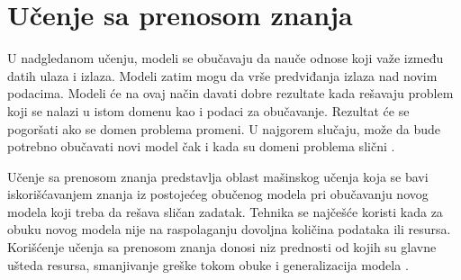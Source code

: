 \documentclass[12pt,oneside]{memoir}
\begin{document}
\section{Učenje sa prenosom znanja}
\label{section3_trasnferucenje}
U nadgledanom učenju, modeli se obučavaju da nauče odnose koji važe između datih ulaza i izlaza. Modeli zatim mogu da vrše predviđanja izlaza nad novim podacima. Modeli će na ovaj način davati dobre rezultate kada rešavaju problem koji se nalazi u istom domenu kao i podaci za obučavanje. Rezultat će se pogoršati ako se domen problema promeni. U najgorem slučaju, može da bude potrebno obučavati novi model čak i kada su domeni problema slični \cite{zhuang2020comprehensive}.

Učenje sa prenosom znanja predstavlja oblast mašinskog učenja koja se bavi iskorišćavanjem znanja iz postojećeg obučenog modela pri obučavanju novog modela koji treba da rešava sličan zadatak. Tehnika se najčešće koristi kada za obuku novog modela nije na raspolaganju dovoljna količina podataka ili resursa. Korišćenje učenja sa prenosom znanja donosi niz prednosti od kojih su glavne ušteda resursa, smanjivanje greške tokom obuke i generalizacija modela \cite{zhuang2020comprehensive}.



\end{document}
